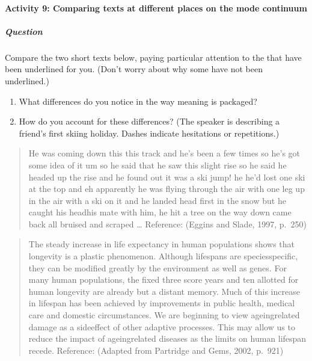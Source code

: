 \documentclass[letterpaper,10pt,english]{sphinxmanual}
\begin{document}
\paragraph{Activity 9: Comparing texts at different places on the mode continuum}
\label{\detokenize{content/session_00/Part_00_05:Activity-9:-Comparing-texts-at-different-places-on-the-mode-continuum}}


\subparagraph{Question}
\label{\detokenize{content/session_00/Part_00_05:Question}}
Compare the two short texts below, paying particular attention to the  that have been underlined for you. (Don’t worry about why some have not been underlined.)
\begin{enumerate}
%
\item {} 
What differences do you notice in the way meaning is packaged?

\item {} 
How do you account for these differences? (The speaker is describing a friend’s first skiing holiday. Dashes indicate hesitations or repetitions.)

\end{enumerate}


\begin{quote}

He was coming down this \textendash{} this track and he’s been a few times so he’s got some idea of it um so he said that he saw this slight rise so he said he headed up the rise and he found out it was a ski jump! he\textendash{} he’d lost one ski at the top and eh apparently he was flying through the air with one leg up in the air with a ski on it and he landed head first in the snow but he caught his headhis mate with him, he hit a tree on the way down came back all bruised and scraped … Reference: (Eggins and
Slade, 1997, p. 250)
\end{quote}








\begin{quote}

The steady increase in life expectancy in human populations shows that longevity is a plastic phenomenon. Although lifespans are species\sphinxhyphen{}specific, they can be modified greatly by the environment as well as genes. For many human populations, the fixed three score years and ten allotted for human longevity are already but a distant memory. Much of this increase in lifespan has been achieved by improvements in public health, medical care and domestic circumstances. We are beginning to view
ageing\sphinxhyphen{}related damage as a side\sphinxhyphen{}effect of other adaptive processes. This may allow us to reduce the impact of ageing\sphinxhyphen{}related diseases as the limits on human lifespan recede. Reference: (Adapted from Partridge and Gems, 2002, p. 921)
\end{quote}
\end{document}

